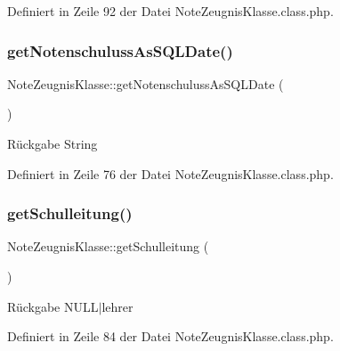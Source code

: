 Definiert in Zeile 92 der Datei Note\+Zeugnis\+Klasse.\+class.\+php.

\mbox{\label{class_note_zeugnis_klasse_a1716994f79a88f2c80f358e0e3165b87}} 
\subsubsection{\texorpdfstring{get\+Notenschuluss\+As\+S\+Q\+L\+Date()}{getNotenschulussAsSQLDate()}}
{\footnotesize\ttfamily Note\+Zeugnis\+Klasse\+::get\+Notenschuluss\+As\+S\+Q\+L\+Date (\begin{DoxyParamCaption}{ }\end{DoxyParamCaption})}

\begin{DoxyReturn}{Rückgabe}
String 
\end{DoxyReturn}


Definiert in Zeile 76 der Datei Note\+Zeugnis\+Klasse.\+class.\+php.

\mbox{\label{class_note_zeugnis_klasse_a2fed95a9ec10c28054d5c23e532e035a}} 
\subsubsection{\texorpdfstring{get\+Schulleitung()}{getSchulleitung()}}
{\footnotesize\ttfamily Note\+Zeugnis\+Klasse\+::get\+Schulleitung (\begin{DoxyParamCaption}{ }\end{DoxyParamCaption})}

\begin{DoxyReturn}{Rückgabe}
N\+U\+L\+L$\vert$lehrer 
\end{DoxyReturn}


Definiert in Zeile 84 der Datei Note\+Zeugnis\+Klasse.\+class.\+php.

\mbox{\label{class_note_zeugnis_klasse_a589840bac3cceb9be7fb60c22aee3c8c}} 
